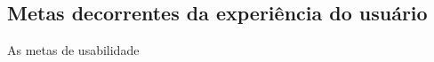 

\subsection{Metas decorrentes da experiência do usuário} %
\label{sub:metas_decorrentes_da_experi_ncia_do_usu_rio}
	As metas de usabilidade 

